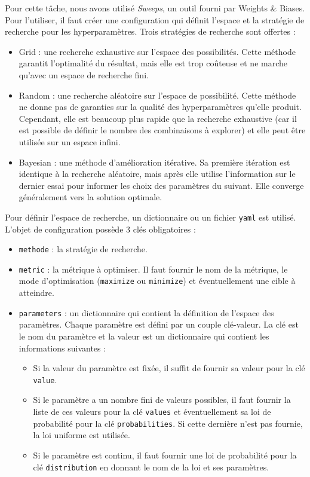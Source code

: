 Pour cette tâche, nous avons utilisé \emph{\foreignlanguage{english}{Sweeps}},
un outil fourni par \foreignlanguage{english}{Weights \& Biases}.
Pour l'utiliser, il faut créer une configuration qui définit l'espace et la stratégie de recherche pour les hyperparamètres.
Trois stratégies de recherche sont offertes :

\begin{itemize}
    \item \foreignlanguage{english}{Grid} : une recherche exhaustive sur l'espace des possibilités.
    Cette méthode garantit l'optimalité du résultat, mais elle est trop coûteuse 
    et ne marche qu'avec un espace de recherche fini.
    \item \foreignlanguage{english}{Random} : une recherche aléatoire sur l'espace de possibilité.
    Cette méthode ne donne pas de garanties sur la qualité des hyperparamètres qu'elle produit.
    Cependant, elle est beaucoup plus rapide que la recherche exhaustive 
    (car il est possible de définir le nombre des combinaisons à explorer)
    et elle peut être utilisée sur un espace infini.
    \item \foreignlanguage{english}{Bayesian} : une méthode d'amélioration itérative.
    Sa première itération est identique à la recherche aléatoire,
    mais après elle utilise l'information sur le dernier essai pour informer les choix des paramètres du suivant.
    Elle converge généralement vers la solution optimale.
\end{itemize}

Pour définir l'espace de recherche, un dictionnaire ou un fichier \verb|yaml| est utilisé.
L'objet de configuration possède 3 clés obligatoires :

\begin{itemize}
    \item \verb|methode| : la stratégie de recherche.
    \item \verb|metric| : la métrique à optimiser. Il faut fournir le nom de la métrique, le mode d'optimisation
    (\verb|maximize| ou \verb|minimize|) et éventuellement une cible à atteindre.
    \item \verb|parameters| : un dictionnaire qui contient la définition de l'espace des paramètres.
    Chaque paramètre est défini par un couple clé-valeur.
    La clé est le nom du paramètre et la valeur est un dictionnaire qui contient les informations suivantes :
    \begin{itemize}
        \item Si la valeur du paramètre est fixée, il suffit de fournir sa valeur pour la clé \verb|value|.
        \item Si le paramètre a un nombre fini de valeurs possibles, il faut fournir la liste de ces valeurs
        pour la clé \verb|values| et éventuellement sa loi de probabilité pour la clé \verb|probabilities|.
        Si cette dernière n'est pas fournie, la loi uniforme est utilisée.
        \item Si le paramètre est continu, il faut fournir une loi de probabilité pour la clé \verb|distribution|
        en donnant le nom de la loi et ses paramètres.
    \end{itemize}
\end{itemize}

